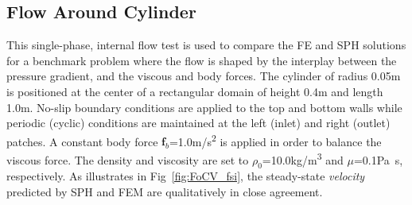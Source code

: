 \subsection{Flow Around Cylinder}
\label{subsec:flowAroundCylinder_fsi}
This single-phase, internal flow test is used to compare the FE and SPH solutions for a benchmark problem where the flow is shaped by the interplay between the pressure gradient, and the viscous and body forces. The cylinder of radius 0.05\si{m} is positioned at the center of a rectangular domain of height 0.4\si{m} and length 1.0\si{m}. No-slip boundary conditions are applied to the top and bottom walls while periodic (cyclic) conditions are maintained at the left (inlet) and right (outlet) patches. A constant body force $\mathbf{f}_b$=1.0\si{m/s^2} is applied in order to balance the viscous force. The density and viscosity are set to $\rho_0$=10.0\si{kg/m^3} and $\mu$=0.1\si{Pa.s}, respectively. As illustrates in Fig~\ref{fig:FoCV_fsi}, the steady-state {\textit{velocity}} predicted by SPH and FEM are qualitatively in close agreement.
